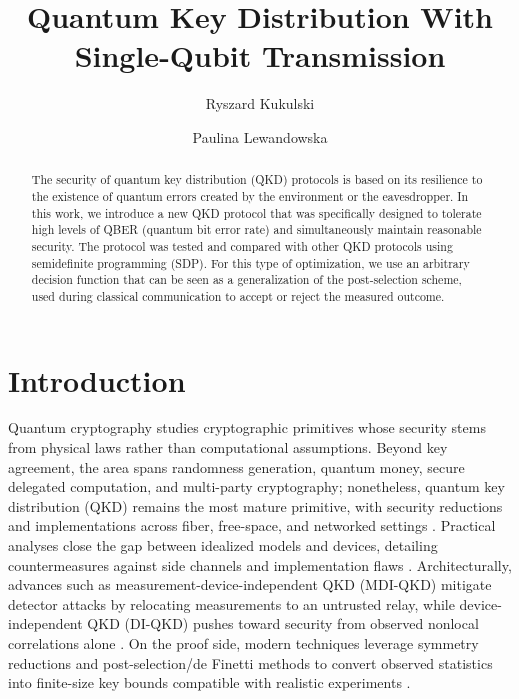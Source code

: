 \documentclass[a4paper,twocolumn,11pt,unpublished]{quantumarticle}
\begin{document}
\title{Quantum Key Distribution With Single-Qubit Transmission}

\author{Ryszard Kukulski}
\author{Paulina Lewandowska}
\maketitle

\begin{abstract}
The security of quantum key distribution (QKD) protocols is based on its
resilience to the existence of quantum errors created by the environment or the
eavesdropper.
In this work, we introduce a new QKD protocol that was specifically designed
to tolerate high levels of QBER (quantum bit error rate) and simultaneously
maintain reasonable security.
The protocol was tested and compared with other QKD protocols using
semidefinite programming (SDP). For this type of optimization, we use an
arbitrary decision function that can be seen as a generalization of the
post-selection scheme, used during classical communication to accept or reject
the measured outcome.
\end{abstract}

\section{Introduction}
Quantum cryptography studies cryptographic primitives whose security stems from
physical laws rather than computational assumptions. Beyond key agreement, the
area spans randomness generation, quantum money, secure delegated computation,
and multi-party cryptography; nonetheless, quantum key distribution (QKD)
remains the most mature primitive, with security reductions and implementations
across fiber, free-space, and networked settings
\cite{ScaraniRMP2009,PirandolaAOP2020}. Practical analyses close the gap between
idealized models and devices, detailing countermeasures against side channels
and implementation flaws \cite{XuRMP2020}. Architecturally, advances such as
measurement-device-independent QKD (MDI-QKD) mitigate detector attacks by
relocating measurements to an untrusted relay, while device-independent QKD
(DI-QKD) pushes toward security from observed nonlocal correlations alone
\cite{LoCurtyQi2012,DIQKDReview2023}. On the proof side, modern techniques
leverage symmetry reductions and post-selection/de Finetti methods to convert
observed statistics into finite-size key bounds compatible with realistic
experiments \cite{ChristandlRenner2009,ShorPreskill2000}.
\end{document}
